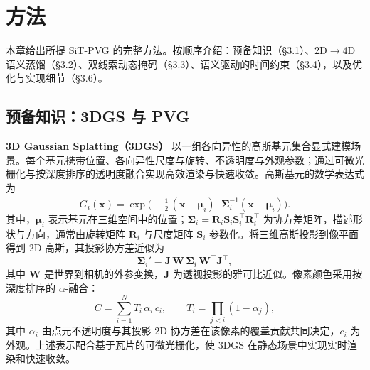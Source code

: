 \documentclass[10pt,conference]{IEEEtran} %
\begin{document}
\section{方法}
本章给出所提 SiT\mbox{-}PVG 的完整方法。按顺序介绍：预备知识（§3.1）、2D$\to$4D 语义蒸馏（§3.2）、双线索动态掩码（§3.3）、语义驱动的时间约束（§3.4），以及优化与实现细节（§3.6）。

\subsection{预备知识：3DGS 与 PVG}
\textbf{3D Gaussian Splatting（3DGS）} 以一组各向异性的高斯基元集合显式建模场景。每个基元携带位置、各向异性尺度与旋转、不透明度与外观参数；通过可微光栅化与按深度排序的透明度融合实现高效渲染与快速收敛。高斯基元的数学表达式为
\begin{equation}
G_i(\bm{x})=\exp\!\Big(-\tfrac{1}{2}\,(\bm{x}-\bm{\mu}_i)^\top \bm{\Sigma}_i^{-1}(\bm{x}-\bm{\mu}_i)\Big).
\end{equation}
其中，$\bm{\mu}_i$ 表示基元在三维空间中的位置；$\bm{\Sigma}_i=\mathbf{R}_i\mathbf{S}_i\mathbf{S}_i^\top\mathbf{R}_i^\top$ 为协方差矩阵，描述形状与方向，通常由旋转矩阵 $\mathbf{R}_i$ 与尺度矩阵 $\mathbf{S}_i$ 参数化。将三维高斯投影到像平面得到 2D 高斯，其投影协方差近似为
\begin{equation}
\bm{\Sigma}_i'=\mathbf{J}\,\mathbf{W}\,\bm{\Sigma}_i\,\mathbf{W}^\top\mathbf{J}^\top,
\end{equation}
其中 $\mathbf{W}$ 是世界到相机的外参变换，$\mathbf{J}$ 为透视投影的雅可比近似。像素颜色采用按深度排序的 $\alpha$-融合：
\begin{equation}
C=\sum_{i=1}^{N} T_i\,\alpha_i\,c_i,\qquad 
T_i=\prod_{j<i}(1-\alpha_j),
\end{equation}
其中 $\alpha_i$ 由点元不透明度与其投影 2D 协方差在该像素的覆盖贡献共同决定，$c_i$ 为外观。上述表示配合基于瓦片的可微光栅化，使 3DGS 在静态场景中实现实时渲染和快速收敛。
\end{document}
